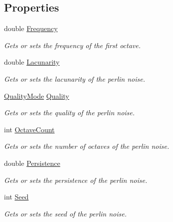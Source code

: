 \subsection*{Properties}
\begin{DoxyCompactItemize}
\item 
double \hyperlink{class_lib_noise_1_1_generator_1_1_perlin_ad04e48902d648cec3c11d94fcef98040}{Frequency}
\begin{DoxyCompactList}\small\item\em Gets or sets the frequency of the first octave. \end{DoxyCompactList}\item 
double \hyperlink{class_lib_noise_1_1_generator_1_1_perlin_a9110ced4dbaa7e042a0afd9e5fc0cde0}{Lacunarity}
\begin{DoxyCompactList}\small\item\em Gets or sets the lacunarity of the perlin noise. \end{DoxyCompactList}\item 
\hyperlink{namespace_lib_noise_ab253d2180e71b8b4b51e250163ca0e27}{Quality\+Mode} \hyperlink{class_lib_noise_1_1_generator_1_1_perlin_a7d39fef8e1ac911f62aa9a9547e0ba6a}{Quality}
\begin{DoxyCompactList}\small\item\em Gets or sets the quality of the perlin noise. \end{DoxyCompactList}\item 
int \hyperlink{class_lib_noise_1_1_generator_1_1_perlin_a5770828024af5b41ca3af590cbcd6966}{Octave\+Count}
\begin{DoxyCompactList}\small\item\em Gets or sets the number of octaves of the perlin noise. \end{DoxyCompactList}\item 
double \hyperlink{class_lib_noise_1_1_generator_1_1_perlin_aacede83f79ff8a71737257a5e74546ef}{Persistence}
\begin{DoxyCompactList}\small\item\em Gets or sets the persistence of the perlin noise. \end{DoxyCompactList}\item 
int \hyperlink{class_lib_noise_1_1_generator_1_1_perlin_a4f2c8cf99ee95e317cfc09d7de9f11e6}{Seed}
\begin{DoxyCompactList}\small\item\em Gets or sets the seed of the perlin noise. \end{DoxyCompactList}\end{DoxyCompactItemize}
